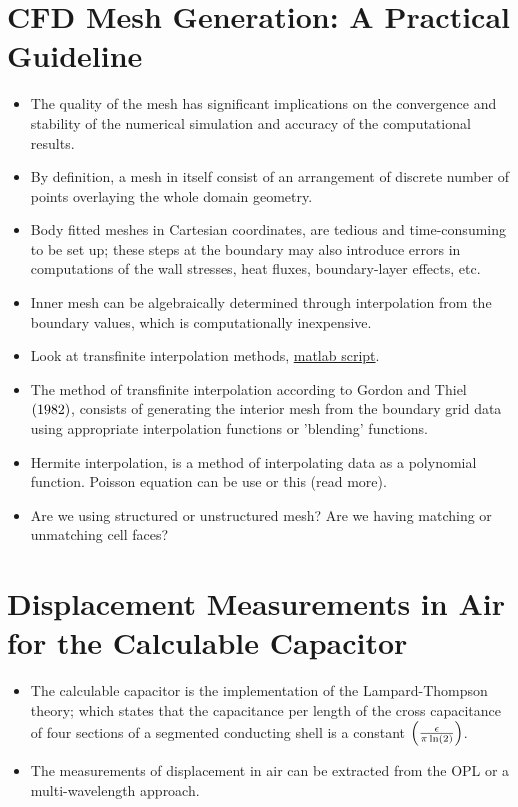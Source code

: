     \section{CFD Mesh Generation: A Practical Guideline}
        \begin{itemize}
            \item The quality of the mesh has significant implications on the convergence and stability of the numerical simulation and accuracy of the computational results. 
            \item By definition, a mesh in itself consist of an arrangement of discrete number of points overlaying the whole domain geometry. 
            \item Body fitted meshes in Cartesian coordinates, are tedious and time-consuming to be set up; these steps at the boundary may also introduce errors in computations of the wall stresses, heat fluxes, boundary-layer effects, etc. 
            \item Inner mesh can be algebraically determined through interpolation from the boundary values, which is computationally inexpensive.   
            \item Look at transfinite interpolation methods, \href{https://www.mathworks.com/matlabcentral/fileexchange/40681-transfinite-interpolation}{matlab script}. 
            \item The method of transfinite interpolation according to Gordon and Thiel $\left(1982\right)$, consists of generating the interior mesh from the boundary grid data using appropriate interpolation functions or 'blending' functions. 
            \item Hermite interpolation, is a method of interpolating data as a polynomial function. Poisson equation can be use or this (read more).  
            \item Are we using structured or unstructured mesh? Are we having matching or unmatching cell faces? 
        \end{itemize}

\fi

\iftrue  
    \section{Displacement Measurements in Air for the Calculable Capacitor \cite{stambaught:cpem:2014}}
        \begin{itemize}
            \item The calculable capacitor is the implementation of the Lampard-Thompson theory; which states that the capacitance per length of the cross capacitance of four sections of a segmented conducting shell is a constant $\left(\frac{\epsilon}{\pi\ln(2)}\right)$. 
            \item The measurements of displacement in air can be extracted from the OPL or a multi-wavelength approach. 
        \end{itemize}

